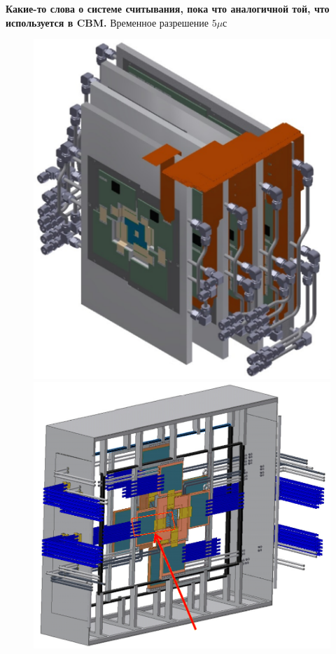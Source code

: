 \textbf{Какие-то слова о системе считывания, пока что аналогичной той, что используется в CBM.}
Временное разрешение $5 \mu$с \todo \todo \todo

\begin{figure}[H]
\begin{minipage}[b]{0.495\textwidth}
\includegraphics[width=1.0\textwidth]{pictures/MVD_1.png}
\end{minipage}
\hspace{0.01\textwidth}
\begin{minipage}[b]{0.495\textwidth}
\includegraphics[width=1.0\textwidth]{pictures/MVD_2.png}
\end{minipage}
\caption{}
\label{fig:MVD12}
\end{figure}

